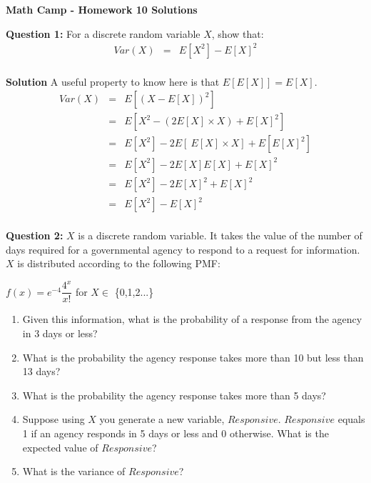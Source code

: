\documentclass[11pt]{article}
\begin{document}
\centerline{\bf Math Camp - Homework 10 Solutions}


\textbf{Question 1:}
For a discrete random variable $X$, show that:
\begin{eqnarray*}
Var(X) &=& E[X^2] - E[X]^2\\
\end{eqnarray*}

\textbf{Solution}
A useful property to know here is that $E[E[X]] = E[X]$. 
\begin{eqnarray*}
Var(X) &=& E[(X - E[X])^2]\\
&=& E[X^2 - (2E[X] \times X) + E[X]^2] \\
&=& E[X^2] - 2E [ \ E[X] \times X] + E[E[X]^2]\\
&=& E[X^2] - 2 E[X]E[X] + E[X]^2\\
&=& E[X^2] - 2 E[X]^2 + E[X]^2\\
&=& E[X^2] - E[X]^2\\
\end{eqnarray*}

\textbf{Question 2:}
$X$ is a discrete random variable. It takes the value of the number of days required for a governmental agency to respond to a request for information. $X$ is distributed according to the following PMF:\\
\bigskip

$f(x) = e^{-4} \dfrac{4^x}{x!}$ for $X \in$ \{0,1,2...\} \\

\begin{enumerate}
\item Given this information, what is the probability of a response from the agency in 3 days or less?
\item What is the probability the agency response takes more than 10 but less than 13 days?
\item What is the probability the agency response takes more than 5 days? 
\item Suppose using $X$ you generate a new variable, $Responsive$. $Responsive$ equals 1 if an agency responds in 5 days or less and 0 otherwise. What is the expected value of $Responsive$?
\item What is the variance of $Responsive$?
\end{enumerate}
\end{document}
